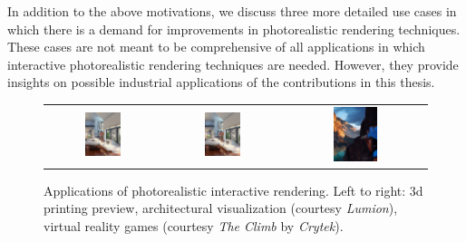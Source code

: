 In addition to the above motivations, we discuss three more detailed use cases in which there is a demand for improvements in photorealistic rendering techniques. These cases are not meant to be comprehensive of all applications in which interactive photorealistic rendering techniques are needed. However, they provide insights on possible industrial applications of the contributions in this thesis.

\begin{figure}
\centering
\begin{tabular}{@{}c@{}c@{}c@{}}
	 \includegraphics[draft,width=0.33\textwidth]{figures/lumion-crop.jpg} & 	 \includegraphics[width=0.33\textwidth]{figures/lumion-crop.jpg} 
& 	 \includegraphics[width=0.33\textwidth]{figures/the-climb-crop.jpg} \\
\end{tabular}
\caption{Applications of photorealistic interactive rendering. Left to right: 3d printing preview, architectural visualization (courtesy \emph{Lumion}), virtual reality games (courtesy \emph{The Climb} by \emph{Crytek}).} 
\label{fig:applications}
\end{figure}

